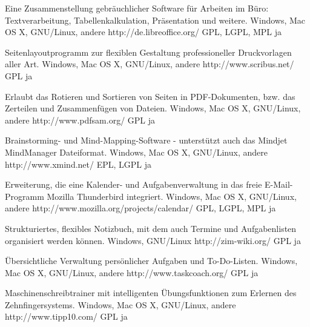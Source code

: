 





{Eine Zusammenstellung gebräuchlicher Software für Arbeiten im Büro: Textverarbeitung, Tabellenkalkulation, Präsentation und weitere.}
{Windows, Mac OS X, GNU/Linux, andere}
{http://de.libreoffice.org/}
{GPL, LGPL, MPL}
{ja}

{Seitenlayoutprogramm zur flexiblen Gestaltung professioneller Druckvorlagen aller Art.}
{Windows, Mac OS X, GNU/Linux, andere}
{http://www.scribus.net/}
{GPL}
{ja}

\newpage 

{Erlaubt das Rotieren und Sortieren von Seiten in PDF-Dokumenten, bzw. das Zerteilen und Zusammenfügen von Dateien.}
{Windows, Mac OS X, GNU/Linux, andere}
{http://www.pdfsam.org/}
{GPL}
{ja}

{Brainstorming- und Mind-Mapping-Software - unterstützt auch das Mindjet MindManager Dateiformat.}
{Windows, Mac OS X, GNU/Linux, andere}
{http://www.xmind.net/}
{EPL, LGPL}
{ja}


\newpage 


{Erweiterung, die eine Kalender- und Aufgabenverwaltung in das freie E-Mail-Programm Mozilla Thunderbird integriert.}
{Windows, Mac OS X, GNU/Linux, andere}
{http://www.mozilla.org/projects/calendar/}
{GPL, LGPL, MPL}
{ja}

{Strukturiertes, flexibles Notizbuch, mit dem auch Termine und Aufgabenlisten organisiert werden können.}
{Windows, GNU/Linux}
{http://zim-wiki.org/}
{GPL}
{ja}

\newpage 

{Übersichtliche Verwaltung persönlicher Aufgaben und To-Do-Listen.}
{Windows, Mac OS X, GNU/Linux, andere}
{http://www.taskcoach.org/}
{GPL}
{ja}


{Maschinenschreibtrainer mit intelligenten Übungsfunktionen zum Erlernen des Zehnfingersystems.}
{Windows, Mac OS X, GNU/Linux, andere}
{http://www.tipp10.com/}
{GPL}
{ja}

\backpage


